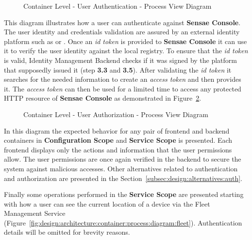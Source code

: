 \begin{figure}[H]
   \centering
   \resizebox{\columnwidth}{!}
   {      
      
   }
   \caption[Container Level - User Authentication - Process View Diagram]{Container Level - User Authentication - Process View Diagram}
   \label{fig:design:architecture:container:process:diagram:authentication}
\end{figure}

This diagram illustrates how a user can authenticate against \textbf{Sensae Console}.
The user identity and credentials validation are assured by an external identity platform such as  or . Once an \textit{id token} is provided to \textbf{Sensae Console} it can use it to verify the user identity against the local registry. To ensure that the \textit{id token} is valid, Identity Management Backend checks if it was signed by the platform that supposedly issued it (step \textbf{3.3} and \textbf{3.5}). After validating the \textit{id token} it searches for the needed information to create an \textit{access token} and then provides it. The \textit{access token} can then be used for a limited time to access any protected HTTP resource of \textbf{Sensae Console} as demonstrated in Figure~\ref{fig:design:architecture:container:process:diagram:authorization}.

\begin{figure}[H]
   \centering
   \resizebox{\columnwidth}{!}
   {
      
   }
   \caption[Container Level - User Authorization - Process View Diagram]{Container Level - User Authorization - Process View Diagram}
   \label{fig:design:architecture:container:process:diagram:authorization}
\end{figure}

In this diagram the expected behavior for any pair of frontend and backend containers in \textbf{Configuration Scope} and \textbf{Service Scope} is presented. Each frontend displays only the actions and information that the user permissions allow. The user permissions are once again verified in the backend to secure the system against malicious accesses. Other alternatives related to authentication and authorization are presented in the Section~\ref{subsec:design:alternatives:auth}.

Finally some operations performed in the \textbf{Service Scope} are presented starting with how a user can see the current location of a device via the Fleet Management Service (Figure~\ref{fig:design:architecture:container:process:diagram:fleet}). Authentication details will be omitted for brevity reasons.

